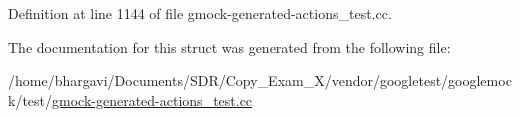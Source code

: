 Definition at line 1144 of file gmock-\/generated-\/actions\+\_\+test.\+cc.



The documentation for this struct was generated from the following file\+:\begin{DoxyCompactItemize}
\item 
/home/bhargavi/\+Documents/\+S\+D\+R/\+Copy\+\_\+\+Exam\+\_\+X/vendor/googletest/googlemock/test/\hyperlink{gmock-generated-actions__test_8cc}{gmock-\/generated-\/actions\+\_\+test.\+cc}\end{DoxyCompactItemize}
